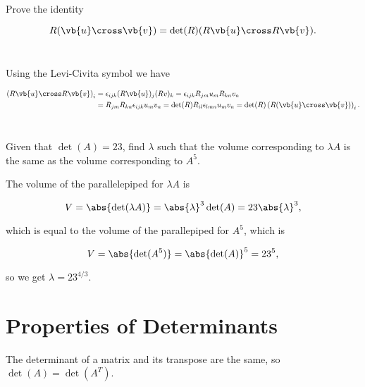 \documentclass[a4paper,12pt]{report}
\begin{document}
{Prove the identity 

\begin{equation}
    R(\vb{u} \cross \vb{v} ) = \det (R) (R\vb{u} \cross R\vb{v} ).
\end{equation}
~
}
{Using the Levi-Civita symbol we have 

\begin{equation}
    \begin{aligned}
        \left( R\vb{u} \cross R\vb{v}  \right)_{i} &= \epsilon _{ijk} (R\vb{u} )_{j}(Rv)_{k} = \epsilon _{ijk} R_{jm}u_{m} R_{kn} v_{n} \\
        &= R_{jm} R_{kn} \epsilon _{ijk}u_{m} v_{n} = \det (R)R_{il}\epsilon _{lmn} u_{m}v_{n} = \det (R)\left( R(\vb{u} \cross \vb{v} ) \right)_{i}.
    \end{aligned}
\end{equation}
~
} 

{Given that \(\det (A) = 23\), find \(\lambda \) such that the volume corresponding to \(\lambda A\) is the same as the volume corresponding to \(A^{5} \).}
{The volume of the parallelepiped for \(\lambda A\) is 

\begin{equation}
    V = \abs{\det (\lambda A)} = \abs{\lambda }^3 \det (A) = 23 \abs{\lambda}^3 , 
\end{equation}

which is equal to the volume of the parallepiped for \(A^{5} \), which is 

\begin{equation}
    V = \abs{\det (A^{5} )} = \abs{\det (A)}^{5} = 23^{5},  
\end{equation}

so we get \(\lambda  = 23^{4/3} \). 
} 

\section{Properties of Determinants} \label{detprop} 

\begin{lemma}
The determinant of a matrix and its transpose are the same, so $\det(A) = \det(A^T)$.
\end{lemma}
\end{document}
